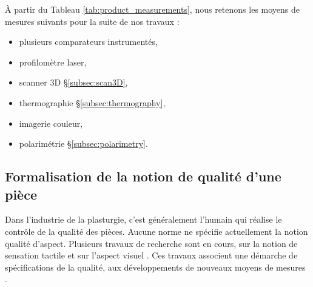 À partir du Tableau \ref{tab:product_measurements}, nous retenons les moyens de mesures suivants pour la suite de nos travaux :
\begin{itemize}
	\item plusieurs comparateurs instrumentés,
	\item profilomètre laser,
	\item scanner 3D §\ref{subsec:scan3D},
	\item thermographie §\ref{subsec:thermography},
	\item imagerie couleur,
	\item polarimétrie §\ref{subsec:polarimetry}.
\end{itemize}
%
%
%


\newpage
\subsection{Formalisation de la notion de qualité d'une pièce}
Dans l'industrie de la plasturgie, c'est généralement l'humain qui réalise le contrôle de la qualité des pièces.
Aucune norme ne spécifie actuellement la notion qualité d'aspect.
Plusieurs travaux de recherche sont en cours, sur la notion de sensation tactile \cite{bruno_albert_formalisation_2016, albert_generic_2016, albert_smart_2017, albert_smart_2019, albert_maitrise_2019} et sur l'aspect visuel \cite{desage_syntactic_2015}.
Ces travaux associent une démarche de spécifications de la qualité, aux développements de nouveaux moyens de mesures \cite{desage_constraints_2015, pitard_metrologie_2016, lacombe_exploitation_2018a}.

